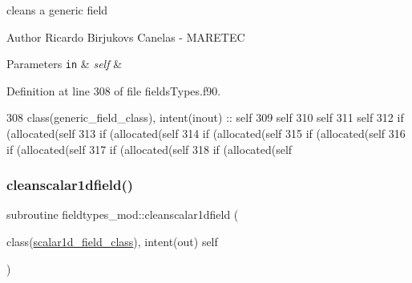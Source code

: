 cleans a generic field 

\begin{DoxyAuthor}{Author}
Ricardo Birjukovs Canelas -\/ M\+A\+R\+E\+T\+EC 
\end{DoxyAuthor}

\begin{DoxyParams}[1]{Parameters}
\mbox{\tt in}  & {\em self} & \\
\hline
\end{DoxyParams}


Definition at line 308 of file fields\+Types.\+f90.


\begin{DoxyCode}
308     \textcolor{keywordtype}{class}(generic\_field\_class), \textcolor{keywordtype}{intent(inout)} :: self
309     self%
310     self%
311     self%
312     \textcolor{keywordflow}{if} (\textcolor{keyword}{allocated}(self%
313     \textcolor{keywordflow}{if} (\textcolor{keyword}{allocated}(self%
314     \textcolor{keywordflow}{if} (\textcolor{keyword}{allocated}(self%
315     \textcolor{keywordflow}{if} (\textcolor{keyword}{allocated}(self%
316     \textcolor{keywordflow}{if} (\textcolor{keyword}{allocated}(self%
317     \textcolor{keywordflow}{if} (\textcolor{keyword}{allocated}(self%
318     \textcolor{keywordflow}{if} (\textcolor{keyword}{allocated}(self%
\end{DoxyCode}
\mbox{\label{namespacefieldtypes__mod_aeb05bd1de9be296711016ad5b607a091}} 
\subsubsection{\texorpdfstring{cleanscalar1dfield()}{cleanscalar1dfield()}}
{\footnotesize\ttfamily subroutine fieldtypes\+\_\+mod\+::cleanscalar1dfield (\begin{DoxyParamCaption}\item[{class(\mbox{\hyperlink{structfieldtypes__mod_1_1scalar1d__field__class}{scalar1d\+\_\+field\+\_\+class}}), intent(out)}]{self }\end{DoxyParamCaption})\hspace{0.3cm}{\ttfamily [private]}}



